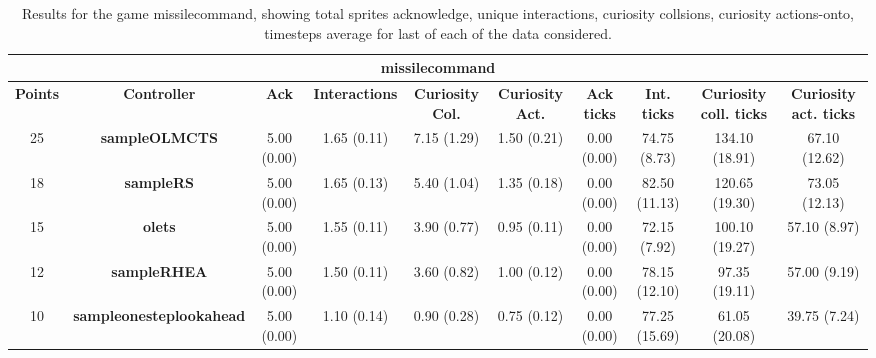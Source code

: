 \begin{table*}[!t]
\begin{center}
\begin{adjustbox}{width=1\textwidth}
\begin{tabular}{|c|c|c|c|c|c|c|c|c|c|}
\multicolumn{10}{c}{\textbf{missilecommand}}\\
\hline
\textbf{Points} & \textbf{Controller} & \textbf{Ack} & \textbf{Interactions} & \textbf{Curiosity Col.} & \textbf{Curiosity Act.} & \textbf{Ack ticks} & \textbf{Int. ticks} & \textbf{Curiosity coll. ticks} & \textbf{Curiosity act. ticks}\\
\hline
25 & \textbf{sampleOLMCTS} & 5.00 (0.00) & 1.65 (0.11) & 7.15 (1.29) & 1.50 (0.21) & 0.00 (0.00) & 74.75 (8.73) & 134.10 (18.91) & 67.10 (12.62)
 \\
\hline
18 & \textbf{sampleRS} & 5.00 (0.00) & 1.65 (0.13) & 5.40 (1.04) & 1.35 (0.18) & 0.00 (0.00) & 82.50 (11.13) & 120.65 (19.30) & 73.05 (12.13)
 \\
\hline
15 & \textbf{olets} & 5.00 (0.00) & 1.55 (0.11) & 3.90 (0.77) & 0.95 (0.11) & 0.00 (0.00) & 72.15 (7.92) & 100.10 (19.27) & 57.10 (8.97)
 \\
\hline
12 & \textbf{sampleRHEA} & 5.00 (0.00) & 1.50 (0.11) & 3.60 (0.82) & 1.00 (0.12) & 0.00 (0.00) & 78.15 (12.10) & 97.35 (19.11) & 57.00 (9.19)
 \\
\hline
10 & \textbf{sampleonesteplookahead} & 5.00 (0.00) & 1.10 (0.14) & 0.90 (0.28) & 0.75 (0.12) & 0.00 (0.00) & 77.25 (15.69) & 61.05 (20.08) & 39.75 (7.24)
 \\
\hline
\end{tabular}
\end{adjustbox}
\caption{Results for the game missilecommand, showing total sprites acknowledge, unique interactions, curiosity collsions, curiosity actions-onto, timesteps average for last of each of the data considered.}
\label{tab:weights}
\end{center}
\end{table*}
